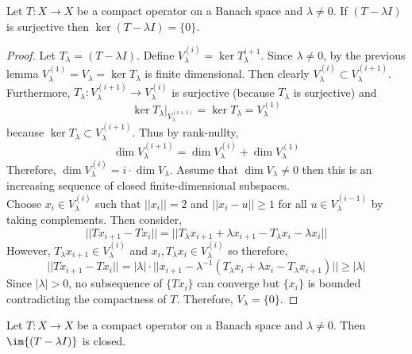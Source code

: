 \documentclass[12pt]{article}
\begin{document}
\begin{lemma}
Let $T : X \to X$ be a compact operator on a Banach space and $\lambda \neq 0$. If $(T - \lambda I)$ is surjective then $\ker{(T - \lambda I)} = \{ 0 \}$.
\end{lemma}

\begin{proof}
Let $T_\lambda = (T - \lambda I)$. Define $V_{\lambda}^{(i)} = \ker{T_\lambda^{i+1}}$. Since $\lambda \neq 0$, by the previous lemma $V_\lambda^{(1)} = V_\lambda = \ker{T_\lambda}$ is finite dimensional. Then clearly $V_{\lambda}^{(i)} \subset V_{\lambda}^{(i+1)}$. Furthermore, $T_{\lambda} : V_{\lambda}^{(i+1)} \to V_{\lambda}^{(i)}$ is surjective (because $T_\lambda$ is surjective) and
\[ \ker{T_\lambda|_{V_\lambda^{(i+1)}}} = \ker{T_\lambda} = V_\lambda^{(1)} \]
because $\ker{T_\lambda} \subset V_\lambda^{(i+1)}$. Thus by rank-nullty,
\[ \dim{V_\lambda^{(i+1)}} = \dim{V_\lambda^{(i)}} + \dim{V_\lambda^{(1)}} \]
Therefore, $\dim{V_\lambda^{(i)}} = i \cdot \dim{V_\lambda}$. Assume that $\dim{V_\lambda} \neq 0$ then this is an increasing sequence of closed finite-dimensional subspaces. 
\bigskip\\
Choose $x_i \in V_{\lambda}^{(i)}$ such that $|| x_i || = 2$ and $|| x_i - u || \ge 1$ for all $u \in V_\lambda^{(i-1)}$ by taking complements. Then consider,
\[ || T x_{i+1} - T x_i || = || T_\lambda x_{i + 1} + \lambda x_{i + 1} - T_\lambda x_i - \lambda x_i || \]
However, $T_\lambda x_{i+1} \in V_\lambda^{(i)}$ and $x_i, T_\lambda x_i \in V_\lambda^{(i)}$ so therefore,
\[ || T x_{i+1} - T x_i || = |\lambda| \cdot || x_{i+1} - \lambda^{-1} (T_\lambda x_i + \lambda x_i - T_\lambda x_{i+1}) || \ge |\lambda| \]
Since $|\lambda| > 0$, no subsequence of $\{ T x_i \}$ can converge but $\{ x_i \}$ is bounded contradicting the compactness of $T$. Therefore, $V_\lambda = \{ 0 \}$.
\end{proof}

\begin{lemma}
Let $T : X \to X$ be a compact operator on a Banach space and $\lambda \neq 0$. Then $\im{(T - \lambda I)}$ is closed. 
\end{lemma}
\end{document}
